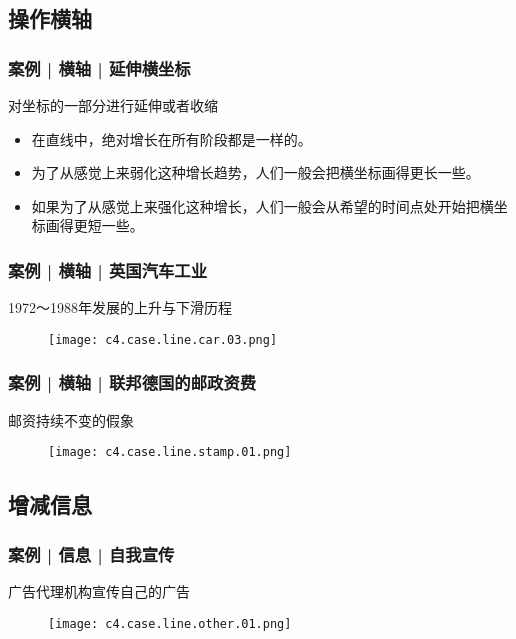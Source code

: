 \subsection{操作横轴}
\begin{frame}
  \frametitle{案例 | 横轴 | 延伸横坐标}
  \begin{block}{对坐标的一部分进行延伸或者收缩}
    \begin{itemize}
      \item<1-> 在直线中，绝对增长在所有阶段都是一样的。
      \item<2-> 为了从感觉上来弱化这种增长趋势，人们一般会把横坐标画得更长一些。
      \item<3-> 如果为了从感觉上来强化这种增长，人们一般会从希望的时间点处开始把横坐标画得更短一些。
    \end{itemize}
    \begin{figure}
      \centering
    \end{figure}
  \end{block}
\end{frame}

\begin{frame}
  \frametitle{案例 | 横轴 | 英国汽车工业}
  \begin{block}{1972～1988年发展的上升与下滑历程}
    \begin{figure}
      \centering
      \texttt{[image: c4.case.line.car.03.png]}
    \end{figure}
  \end{block}
\end{frame}

\begin{frame}
  \frametitle{案例 | 横轴 | 联邦德国的邮政资费}
  \begin{block}{邮资持续不变的假象}
    \begin{figure}
      \centering
      \texttt{[image: c4.case.line.stamp.01.png]}
    \end{figure}
  \end{block}
\end{frame}

\subsection{增减信息}
\begin{frame}
  \frametitle{案例 | 信息 | 自我宣传}
  \begin{block}{广告代理机构宣传自己的广告}
    \begin{figure}
      \centering
      \texttt{[image: c4.case.line.other.01.png]}
    \end{figure}
  \end{block}
\end{frame}

